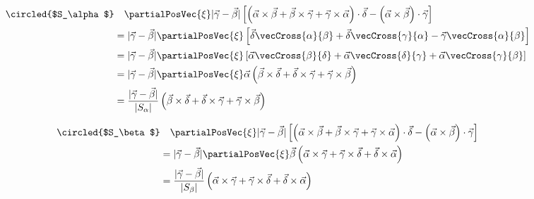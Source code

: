 \begin{align}
  \text{\circled{$S_\alpha$}} &\quad\partialPosVec{\xi}
    \lvert\vec{\gamma} - \vec{\beta}\rvert 
    \left[
      \left(
        \vec{\alpha} \times \vec{\beta}
        + \vec{\beta} \times \vec{\gamma} 
        + \vec{\gamma} \times \vec{\alpha}
      \right) \cdot \vec{\delta}
      - \left(\vec{\alpha} \times \vec{\beta}\right) \cdot \vec{\gamma}
    \right]\\
  &= \lvert\vec{\gamma} - \vec{\beta}\rvert 
    \partialPosVec{\xi}\left[
      \vec{\delta}\vecCross{\alpha}{\beta} 
      + \vec{\delta}\vecCross{\gamma}{\alpha}
      - \vec{\gamma}\vecCross{\alpha}{\beta}
    \right]\\
  &= \lvert\vec{\gamma} - \vec{\beta}\rvert 
    \partialPosVec{\xi}\left[
      \vec{\alpha}\vecCross{\beta}{\delta} 
      + \vec{\alpha}\vecCross{\delta}{\gamma}
      + \vec{\alpha}\vecCross{\gamma}{\beta}
    \right]\\
  &= \lvert\vec{\gamma} - \vec{\beta}\rvert 
    \partialPosVec{\xi}\vec{\alpha}\left(
      \vec{\beta} \times \vec{\delta} 
      + \vec{\delta} \times \vec{\gamma}
      + \vec{\gamma} \times \vec{\beta}
    \right)\\
  &=  \frac{\lvert\vec{\gamma} - \vec{\beta}\rvert}{\lvert S_\alpha\rvert}
    \left(
      \vec{\beta} \times \vec{\delta} 
      + \vec{\delta} \times \vec{\gamma}
      + \vec{\gamma} \times \vec{\beta}
    \right)
\end{align}

\begin{align}
  \text{\circled{$S_\beta$}} &\quad\partialPosVec{\xi}
    \lvert\vec{\gamma} - \vec{\beta}\rvert 
    \left[
      \left(
        \vec{\alpha} \times \vec{\beta}
        + \vec{\beta} \times \vec{\gamma} 
        + \vec{\gamma} \times \vec{\alpha}
      \right) \cdot \vec{\delta}
      - \left(\vec{\alpha} \times \vec{\beta}\right) \cdot \vec{\gamma}
    \right]\\
  &= \lvert\vec{\gamma} - \vec{\beta}\rvert\partialPosVec{\xi}
    \vec{\beta}
    \left(
      \vec{\alpha} \times \vec{\gamma}
      + \vec{\gamma} \times \vec{\delta}
      + \vec{\delta} \times \vec{\alpha}
    \right)\\
  &=  \frac{\lvert\vec{\gamma} - \vec{\beta}\rvert}{\lvert S_\beta\rvert}
    \left(
      \vec{\alpha} \times \vec{\gamma}
      + \vec{\gamma} \times \vec{\delta}
      + \vec{\delta} \times \vec{\alpha}
    \right)
\end{align}

